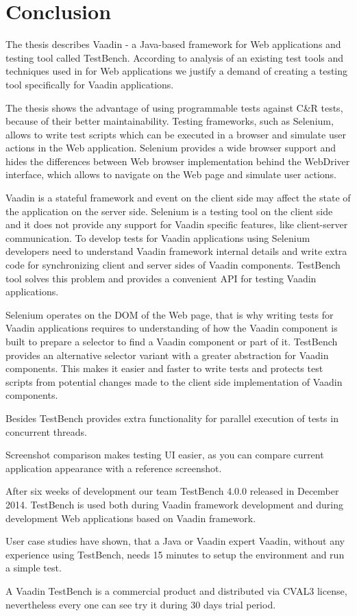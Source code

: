 \chapter {Conclusion}
\label{ch:conclusion}
 The thesis describes Vaadin - a Java-based framework for Web applications and
testing tool called TestBench.
 According to analysis of an existing test tools and techniques used in for Web
applications we justify a demand of creating a testing tool specifically
for Vaadin applications. 

The thesis shows the advantage of using programmable tests against C\&R tests,
because of their better maintainability. Testing frameworks, such as Selenium,
allows to write test scripts which can be executed in a browser and simulate
user actions in the Web application. Selenium provides a wide browser support
and hides the differences between Web browser implementation behind the
WebDriver interface, which allows to navigate on the Web page and simulate user
actions.

Vaadin is a stateful framework and event on the client side may affect the state
of the application on the server side. Selenium is a testing tool on the client
side and it does not provide any support for Vaadin specific features, like
client-server communication. To develop tests for Vaadin applications using
Selenium developers need to understand Vaadin framework internal details and 
write extra code for synchronizing client and server sides of Vaadin components.
TestBench tool solves this problem and provides a convenient API for testing Vaadin applications.

Selenium operates on the DOM of the Web page, that is why writing tests for
Vaadin applications requires to understanding of how the Vaadin component is
built to prepare a selector to find a Vaadin component or part of it. TestBench
provides an alternative selector variant with a greater abstraction for Vaadin components.
This makes it easier and faster to write tests and protects test scripts from potential
changes made to the client side implementation of Vaadin components.

Besides TestBench provides extra functionality for parallel execution of
tests in concurrent threads. 

Screenshot comparison makes testing UI easier,
as you can compare current application appearance with a reference screenshot.

After six weeks of development our team TestBench 4.0.0 released in December
2014. TestBench is used both during Vaadin framework development and during
development Web applications based on Vaadin framework.

 User case studies have shown, that a Java or Vaadin expert Vaadin,
 without any experience using TestBench, needs 15 minutes to setup the
 environment and run a simple test.
 
 A Vaadin TestBench is a commercial product and distributed via CVAL3 license,
 nevertheless every one can see try it during 30 days trial period.